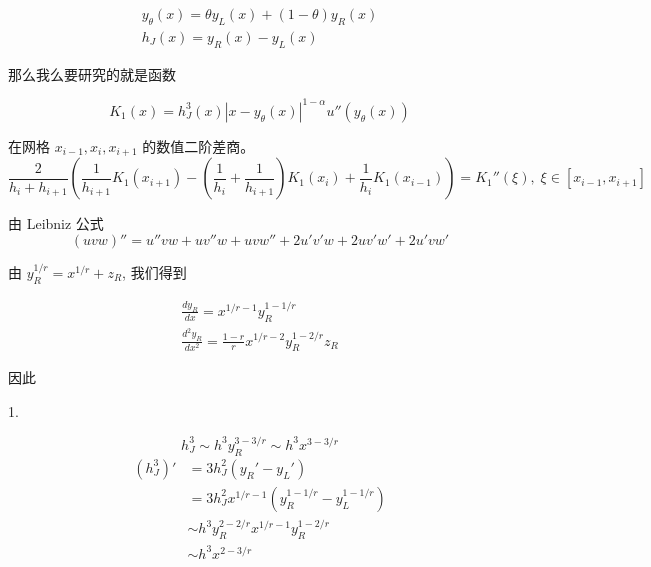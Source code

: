 \documentclass{ctexart}
\begin{document}
\begin{gather}
    y_\theta(x) = \theta y_L(x) + (1-\theta) y_R(x)      \\
    h_J(x) = y_R(x) - y_L(x)
\end{gather}

那么我么要研究的就是函数

\begin{equation}
    K_1(x) = h_J^3(x) |x - y_\theta(x)|^{1-\alpha} u''(y_\theta(x))
\end{equation}

在网格 \(x_{i-1}, x_i , x_{i+1}\) 的数值二阶差商。
\begin{equation}
    \frac{2}{h_i + h_{i+1}}
    ( \frac{1}{h_{i+1}}  K_1(x_{i+1}) - (\frac{1}{h_{i}} + \frac{1}{h_{i+1}}) K_1(x_{i}) + \frac{1}{h_{i}} K_1(x_{i-1})) = K_1''(\xi), \;\xi\in [x_{i-1}, x_{i+1}]
\end{equation}

由 Leibniz 公式
\begin{equation}
    (uvw)'' = u''vw + uv''w + uvw'' + 2u'v'w + 2uv'w' + 2u'vw'
\end{equation}

由 \(y_R^{1/r} = x^{1/r} + z_R\), 我们得到

\begin{gather}
    \frac{d y_R}{dx} = x^{1/r-1} y_R^{1-1/r}    \\
    \frac{d^2 y_R}{dx^2} = \frac{1-r}{r} x^{1/r-2} y_R^{1-2/r}z_R
\end{gather}

因此

1.

\begin{equation}
    h_J^3 \sim h^3 y_R^{3-3/r} \sim h^3 x^{3-3/r}
\end{equation}
\begin{equation}
    \begin{aligned}
        (h_J^3)' & = 3 h_J^2 (y_R' - y_L ')                       \\
                 & = 3 h_J^2 x^{1/r-1}(y_R^{1-1/r} - y_L^{1-1/r}) \\
                 & \sim h^3 y_R^{2-2/r} x^{1/r-1} y_R^{1-2/r}     \\
                 & \sim h^3 x^{2-3/r}
    \end{aligned}
\end{equation}
\end{document}
